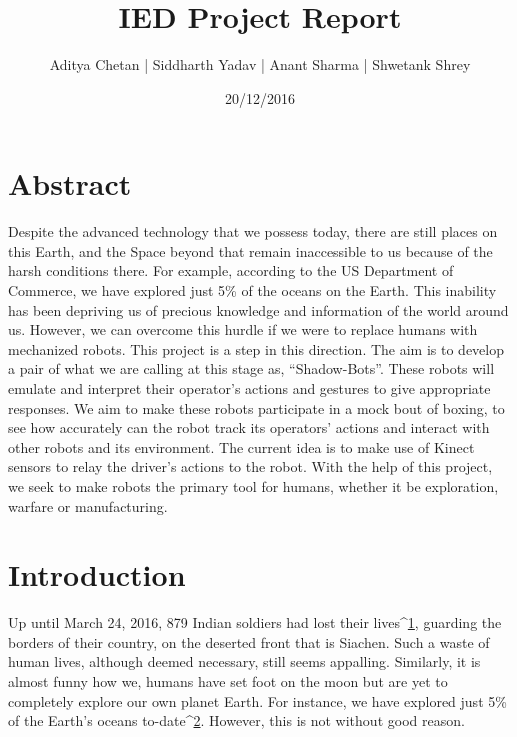 \documentclass[11pt]{article}
\title{IED Project Report}
\author{Aditya Chetan | Siddharth Yadav | Anant Sharma | Shwetank Shrey}
\date{20/12/2016}
\begin{document}
\maketitle

\setcounter{tocdepth}{3}
\tableofcontents
\vspace*{1cm}

\newpage
\section{\textbf{Abstract}}
\label{sec-1}


Despite the advanced technology that we possess today, there are still places on this Earth, and the Space beyond that remain inaccessible to us because of the harsh conditions there. For example, according to the US Department of Commerce, we have explored just 5\% of the oceans on the Earth. This inability has been depriving us of precious knowledge and information of the world around us. However, we can overcome this hurdle if we were to replace humans with mechanized robots. This project is a step in this direction. The aim is to develop a pair of what we are calling at this stage as, ``Shadow-Bots''. These robots will emulate and interpret their operator's actions and gestures to give appropriate responses. We aim to make these robots participate in a mock bout of boxing, to see how accurately can the robot track its operators' actions and interact with other robots and its environment. The current idea is to make use of Kinect sensors to relay the driver's actions to the robot. With the help of this project, we seek to make robots the primary tool for humans, whether it be exploration, warfare or manufacturing.

\newpage
\section{\textbf{Introduction}}
\label{sec-2}


Up until March 24, 2016, 879 Indian soldiers had lost their lives^{\href{http://www.thehindu.com/news/national/in-siachen-869-army-men-died-battling-the-elements/article7978149.ece}{1}}, guarding the borders of their country, on the deserted front that is Siachen. Such a waste of human lives, although deemed necessary, still seems appalling. Similarly, it is almost funny how we, humans have set foot on the moon but are yet to completely explore our own planet Earth. For instance, we have explored just 5\% of the Earth’s oceans to-date^{\href{http://oceanservice.noaa.gov/facts/exploration.html}{2}}. However, this is not without good reason.
\end{document}
